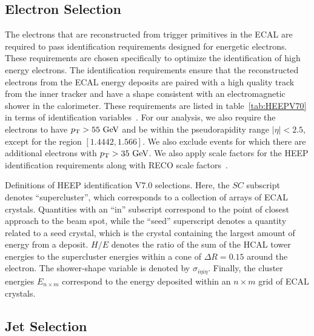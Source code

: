 \subsection{Electron Selection}
\label{subsec:elecSelect}

The electrons that are reconstructed from trigger primitives in the ECAL are required to pass identification requirements designed for energetic electrons.
These requirements are chosen specifically to optimize the identification of high energy electrons.
The identification requirements ensure that the reconstructed electrons from the ECAL energy deposits are paired with a high quality track from the inner tracker and have a shape consistent with an electromagnetic shower in the calorimeter.
These requirements are listed in table~\ref{tab:HEEPV70} in terms of identification variables~\cite{CMSe}.
For our analysis, we also require the electrons to have $\pt>55\unit{GeV}$ and be within the pseudorapidity range $|\eta|<2.5$, except for the region $[1.4442,1.566]$. %
We also exclude events for which there are additional electrons with $\pt>35\unit{GeV}$.
We also apply scale factors for the HEEP identification requirements along with RECO scale factors~\cite{EgammaScale}.

\begin{table}[htbp]
  \centering
  
  \caption{
    Definitions of HEEP identification V7.0 selections.
    Here, the $SC$ subscript denotes ``supercluster'', which corresponds to a collection of arrays of ECAL crystals.
    Quantities with an ``in'' subscript correspond to the point of closest approach to the beam spot, while the ``seed'' superscript denotes a quantity related to a seed crystal, which is the crystal containing the largest amount of energy from a deposit.
    $H/E$ denotes the ratio of the sum of the HCAL tower energies to the supercluster energies within a cone of $\Delta R=0.15$ around the electron.
    The shower-shape variable is denoted by $\sigma_{i\eta i\eta}$.
    Finally, the cluster energies $E_{n\times m}$ correspond to the energy deposited within an $n\times m$ grid of ECAL crystals.
  }
  \label{tab:HEEPV70}
\end{table}

\subsection{Jet Selection}
\label{subsec:jetSelect}


